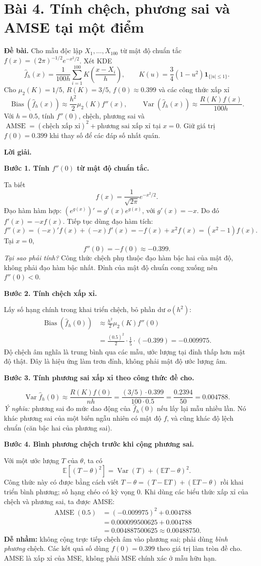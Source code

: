 \documentclass[11pt,a4paper]{article}
\newcommand{\E}{\mathbb E}
\newcommand{\fh}{\widehat f_h}
\DeclareMathOperator{\Var}{Var}
\DeclareMathOperator{\Bias}{Bias}
\DeclareMathOperator{\AMSE}{AMSE}
\newcommand{\buoc}[1]{\par\medskip\textbf{#1}\par}
\begin{document}
\clearpage
\section*{Bài 4. Tính chệch, phương sai và AMSE tại một điểm}
\textbf{Đề bài.} Cho mẫu độc lập $X_1,\ldots,X_{100}$ từ mật độ chuẩn tắc
$f(x)=(2\pi)^{-1/2}e^{-x^2/2}$. Xét KDE
\[
\widehat f_h(x)=\frac1{100h}\sum_{i=1}^{100}K\left(\frac{x-X_i}{h}\right),\qquad
K(u)=\frac34(1-u^2)\mathbf1_{\{|u|\leq1\}}.
\]
Cho $\mu_2(K)=1/5$, $R(K)=3/5$, $f(0)\approx0.399$ và các công thức xấp xỉ
\[
\Bias(\widehat f_h(x))\approx\frac{h^2}{2}\mu_2(K)f''(x),\qquad
\Var(\widehat f_h(x))\approx\frac{R(K)f(x)}{100h}.
\]
Với $h=0.5$, tính $f''(0)$, chệch, phương sai và
$\AMSE=(\text{chệch xấp xỉ})^2+\text{phương sai xấp xỉ}$ tại $x=0$.
Giữ giá trị $f(0)=0.399$ khi thay số để các đáp số nhất quán.

\textbf{Lời giải.}
\buoc{Bước 1. Tính $f''(0)$ từ mật độ chuẩn tắc.}
Ta biết
\[
f(x)=\frac1{\sqrt{2\pi}}e^{-x^2/2}.
\]
Đạo hàm hàm hợp: $(e^{g(x)})'=g'(x)e^{g(x)}$, với $g'(x)=-x$. Do đó $f'(x)=-xf(x)$. Tiếp tục dùng đạo hàm tích:
\[
f''(x)=(-x)'f(x)+(-x)f'(x)
=-f(x)+x^2f(x)=(x^2-1)f(x).
\]
Tại $x=0$,
\[
\boxed{f''(0)=-f(0)\approx-0.399.}
\]
\textit{Tại sao phải tính?} Công thức chệch phụ thuộc đạo hàm bậc hai của mật độ, không phải đạo hàm bậc nhất. Đỉnh của mật độ chuẩn cong xuống nên $f''(0)<0$.

\buoc{Bước 2. Tính chệch xấp xỉ.}
Lấy số hạng chính trong khai triển chệch, bỏ phần dư $o(h^2)$:
\begin{align*}
\Bias(\fh(0))&\approx\frac{h^2}{2}\mu_2(K)f''(0)\\
&=\frac{(0.5)^2}{2}\cdot\frac15\cdot(-0.399)
=\boxed{-0.009975}.
\end{align*}
Độ chệch âm nghĩa là trung bình qua các mẫu, ước lượng tại đỉnh thấp hơn mật độ thật. Đây là hiệu ứng làm trơn đỉnh, không phải mật độ ước lượng âm.

\buoc{Bước 3. Tính phương sai xấp xỉ theo công thức đề cho.}
\[
\Var\fh(0)\approx\frac{R(K)f(0)}{nh}
=\frac{(3/5)\cdot0.399}{100\cdot0.5}
=\frac{0.2394}{50}=\boxed{0.004788}.
\]
\textit{Ý nghĩa:} phương sai đo mức dao động của $\fh(0)$ nếu lấy lại mẫu nhiều lần. Nó khác phương sai của một biến ngẫu nhiên có mật độ $f$, và cũng khác độ lệch chuẩn (căn bậc hai của phương sai).

\buoc{Bước 4. Bình phương chệch trước khi cộng phương sai.}
Với một ước lượng $T$ của $\theta$, ta có
\[
\E[(T-\theta)^2]=\Var(T)+(\E T-\theta)^2.
\]
Công thức này có được bằng cách viết $T-\theta=(T-\E T)+(\E T-\theta)$ rồi khai triển bình phương; số hạng chéo có kỳ vọng 0. Khi dùng các biểu thức xấp xỉ của chệch và phương sai, ta được AMSE:
\begin{align*}
\AMSE(0.5)&=(-0.009975)^2+0.004788\\
&=0.000099500625+0.004788\\
&=\boxed{0.004887500625\approx0.00488750}.
\end{align*}
\textbf{Dễ nhầm:} không cộng trực tiếp chệch âm vào phương sai; phải dùng \emph{bình phương} chệch. Các kết quả số dùng $f(0)=0.399$ theo giá trị làm tròn đề cho. AMSE là xấp xỉ của MSE, không phải MSE chính xác ở mẫu hữu hạn.
\end{document}
